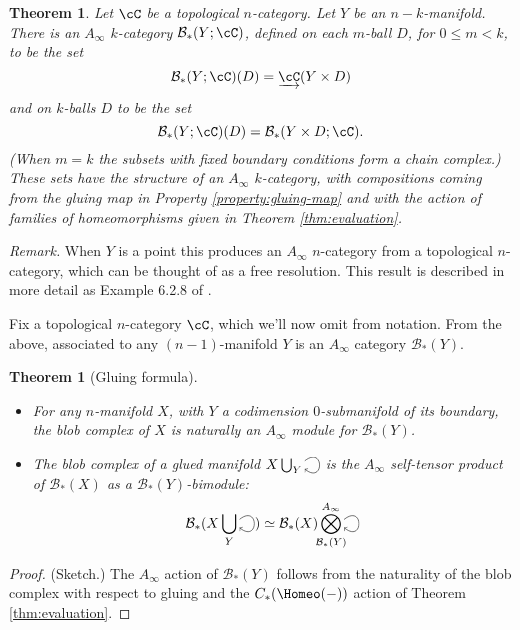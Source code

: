 \documentclass{pnastwo}
\def\bc{{\mathcal B}}
\newcommand{\cl}[1]{\underrightarrow{#1}}
\newcommand{\Tensor}{\bigotimes}
\newcommand{\selfarrow}{\ensuremath{\smash{\tikz[baseline]{\clip (0,0.36) rectangle (0.39,-0.16); \draw[->] (0,0.2) .. controls (0.5,0.6) and (0.5,-0.4) .. (0,0);}}}}
\newtheorem{thm}[prop]{Theorem}
\newenvironment{rem}{\noindent\textsl{Remark.}}{}
\def\clap#1{\hbox to 0pt{\hss#1\hss}}
\def\mathclap{\mathpalette\mathclapinternal}
\def\mathclapinternal#1#2{%
\clap{$\mathsurround=0pt#1{#2}$}}
\begin{document}
\begin{article}
\begin{thm}
\label{thm:blobs-ainfty}
Let $\cC$ be  a topological $n$-category.
Let $Y$ be an $n{-}k$-manifold. 
There is an $A_\infty$ $k$-category $\bc_*(Y;\cC)$, defined on each $m$-ball $D$, for $0 \leq m < k$, 
to be the set $$\bc_*(Y;\cC)(D) = \cl{\cC}(Y \times D)$$ and on $k$-balls $D$ to be the set 
$$\bc_*(Y;\cC)(D) = \bc_*(Y \times D; \cC).$$ 
(When $m=k$ the subsets with fixed boundary conditions form a chain complex.) 
These sets have the structure of an $A_\infty$ $k$-category, with compositions coming from the gluing map in 
Property \ref{property:gluing-map} and with the action of families of homeomorphisms given in Theorem \ref{thm:evaluation}.
\end{thm}
\begin{rem}
When $Y$ is a point this produces an $A_\infty$ $n$-category from a topological $n$-category, 
which can be thought of as a free resolution.
\end{rem}
This result is described in more detail as Example 6.2.8 of \cite{1009.5025}.

Fix a topological $n$-category $\cC$, which we'll now omit from notation.
From the above, associated to any $(n{-}1)$-manifold $Y$ is an $A_\infty$ category $\bc_*(Y)$.

\begin{thm}[Gluing formula]
\label{thm:gluing}
\mbox{}\vspace{-0.2cm}%
\begin{itemize}
\item For any $n$-manifold $X$, with $Y$ a codimension $0$-submanifold of its boundary, 
the blob complex of $X$ is naturally an
$A_\infty$ module for $\bc_*(Y)$.

\item The blob complex of a glued manifold $X\bigcup_Y \selfarrow$ is the $A_\infty$ self-tensor product of
$\bc_*(X)$ as a $\bc_*(Y)$-bimodule:
\begin{equation*}
\bc_*(X\bigcup_Y \selfarrow) \simeq \bc_*(X) \Tensor^{A_\infty}_{\mathclap{\bc_*(Y)}} \selfarrow
\end{equation*}
\end{itemize}
\end{thm}

\begin{proof} (Sketch.)
The $A_\infty$ action of $\bc_*(Y)$ follows from the naturality of the blob complex with respect to gluing
and the $C_*(\Homeo(-))$ action of Theorem \ref{thm:evaluation}.


\end{proof}
\end{article}
\end{document}
